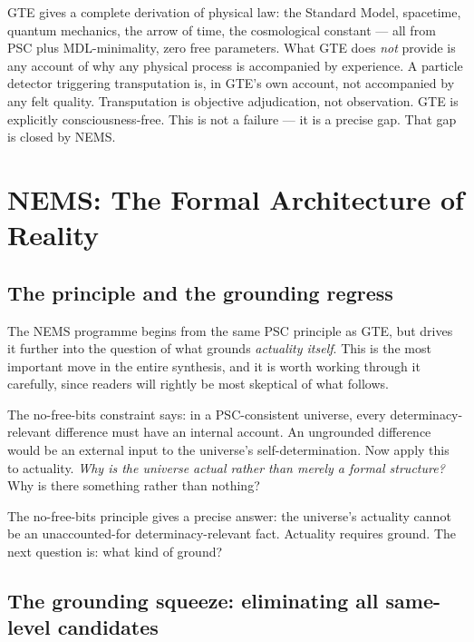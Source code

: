 \documentclass[11pt]{article}
\theoremstyle{remark}
\begin{document}
\begin{tcolorbox}[colback=gray!14,colframe=gray!50!black,
  title={What GTE establishes and what it leaves open}]
GTE gives a complete derivation of physical law: the Standard Model, spacetime,
quantum mechanics, the arrow of time, the cosmological constant --- all from PSC
plus MDL-minimality, zero free parameters. What GTE does \emph{not} provide is any
account of why any physical process is accompanied by experience. A particle detector
triggering transputation is, in GTE's own account, not accompanied by any felt quality.
Transputation is objective adjudication, not observation. GTE is explicitly
consciousness-free. This is not a failure --- it is a precise gap. That gap is closed
by NEMS.
\end{tcolorbox}

\section{NEMS: The Formal Architecture of Reality}\label{sec:nems}

\subsection{The principle and the grounding regress}

The NEMS programme begins from the same PSC principle as GTE, but drives it further
into the question of what grounds \emph{actuality itself}. This is the most important
move in the entire synthesis, and it is worth working through it carefully, since
readers will rightly be most skeptical of what follows.

The no-free-bits constraint says: in a PSC-consistent universe, every
determinacy-relevant difference must have an internal account. An ungrounded difference
would be an external input to the universe's self-determination. Now apply this to
actuality. \emph{Why is the universe actual rather than merely a formal structure?}
Why is there something rather than nothing?

The no-free-bits principle gives a precise answer: the universe's actuality cannot be
an unaccounted-for determinacy-relevant fact. Actuality requires ground. The next
question is: what kind of ground?

\subsection{The grounding squeeze: eliminating all same-level candidates}\label{sec:squeeze}
\end{document}
